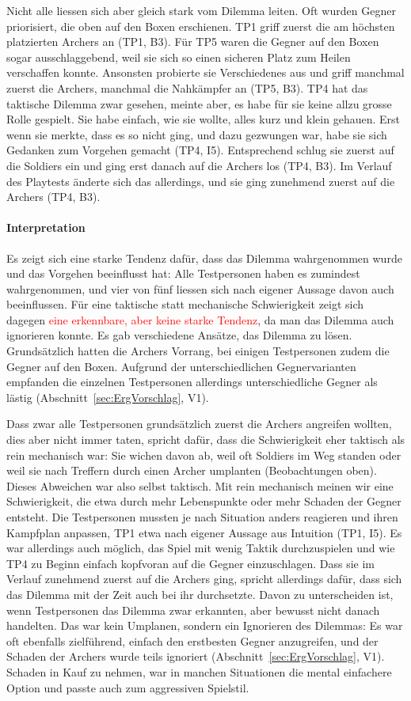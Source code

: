 \documentclass[../Main.tex]{subfiles}
\begin{document}
Nicht alle liessen sich aber gleich stark vom Dilemma leiten. Oft wurden Gegner priorisiert, die oben auf den Boxen erschienen. TP1 griff zuerst die am höchsten platzierten Archers an (TP1, B3). Für TP5 waren die Gegner auf den Boxen sogar ausschlaggebend, weil sie sich so einen sicheren Platz zum Heilen verschaffen konnte. Ansonsten probierte sie Verschiedenes aus und griff manchmal zuerst die Archers, manchmal die Nahkämpfer an (TP5, B3). TP4 hat das taktische Dilemma zwar gesehen, meinte aber, es habe für sie keine allzu grosse Rolle gespielt. Sie habe einfach, wie sie wollte, alles kurz und klein gehauen. Erst wenn sie merkte, dass es so nicht ging, und dazu gezwungen war, habe sie sich Gedanken zum Vorgehen gemacht (TP4, I5). Entsprechend schlug sie zuerst auf die Soldiers ein und ging erst danach auf die Archers los (TP4, B3). Im Verlauf des Playtests änderte sich das allerdings, und sie ging zunehmend zuerst auf die Archers (TP4, B3).

\paragraph{Interpretation}
Es zeigt sich eine starke Tendenz dafür, dass das Dilemma wahrgenommen wurde und das Vorgehen beeinflusst hat: Alle Testpersonen haben es zumindest wahrgenommen, und vier von fünf liessen sich nach eigener Aussage davon auch beeinflussen. Für eine taktische statt mechanische Schwierigkeit zeigt sich dagegen \textcolor{red}{eine erkennbare, aber keine starke Tendenz}, da man das Dilemma auch ignorieren konnte. Es gab verschiedene Ansätze, das Dilemma zu lösen. Grundsätzlich hatten die Archers Vorrang, bei einigen Testpersonen zudem die Gegner auf den Boxen. Aufgrund der unterschiedlichen Gegnervarianten empfanden die einzelnen Testpersonen allerdings unterschiedliche Gegner als lästig (Abschnitt~\ref{sec:ErgVorschlag}, V1).

Dass zwar alle Testpersonen grundsätzlich zuerst die Archers angreifen wollten, dies aber nicht immer taten, spricht dafür, dass die Schwierigkeit eher taktisch als rein mechanisch war: Sie wichen davon ab, weil oft Soldiers im Weg standen oder weil sie nach Treffern durch einen Archer umplanten (Beobachtungen oben). Dieses Abweichen war also selbst taktisch. Mit rein mechanisch meinen wir eine Schwierigkeit, die etwa durch mehr Lebenspunkte oder mehr Schaden der Gegner entsteht. Die Testpersonen mussten je nach Situation anders reagieren und ihren Kampfplan anpassen, TP1 etwa nach eigener Aussage aus Intuition (TP1, I5). Es war allerdings auch möglich, das Spiel mit wenig Taktik durchzuspielen und wie TP4 zu Beginn einfach kopfvoran auf die Gegner einzuschlagen. Dass sie im Verlauf zunehmend zuerst auf die Archers ging, spricht allerdings dafür, dass sich das Dilemma mit der Zeit auch bei ihr durchsetzte. Davon zu unterscheiden ist, wenn Testpersonen das Dilemma zwar erkannten, aber bewusst nicht danach handelten. Das war kein Umplanen, sondern ein Ignorieren des Dilemmas: Es war oft ebenfalls zielführend, einfach den erstbesten Gegner anzugreifen, und der Schaden der Archers wurde teils ignoriert (Abschnitt~\ref{sec:ErgVorschlag}, V1). Schaden in Kauf zu nehmen, war in manchen Situationen die mental einfachere Option und passte auch zum aggressiven Spielstil.
\end{document}
